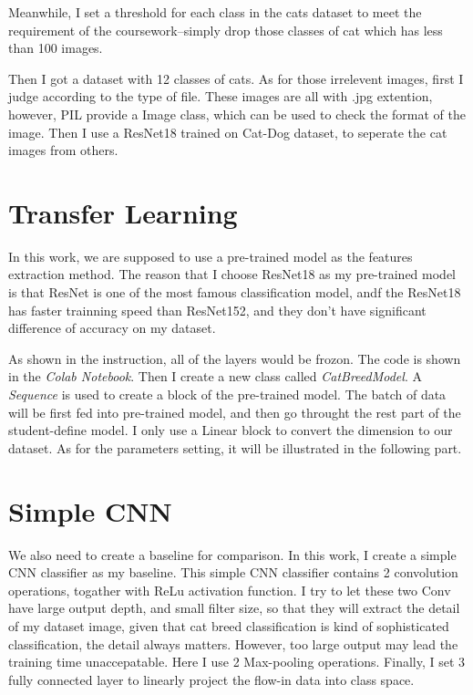 \documentclass[12pt]{article}
\begin{document}
Meanwhile, I set a threshold for each class in the cats dataset to
meet the requirement of the coursework--simply drop those classes
of cat which has less than 100 images.

Then I got a dataset with 12 classes of cats. 
As for those irrelevent images, first I judge according to the type of file.
These images are all with .jpg extention, however, PIL provide a Image class,
which can be used to check the format of the image.
Then I use a ResNet18 trained on Cat-Dog dataset, to seperate the cat images from others.

\section{Transfer Learning}
In this work, we are supposed to use a pre-trained model 
as the features extraction method. The reason that I choose 
ResNet18 as my pre-trained model is that ResNet is one of the most famous classification model\cite{targ2016resnet}\cite{akiba2017extremely},
andf the ResNet18 has faster trainning speed than ResNet152,
and they don't have significant difference of accuracy on my dataset.

As shown in the instruction, all of the layers would be frozon. 
The code is shown in the \textit{Colab Notebook}. 
Then I create a new class called \textit{CatBreedModel}. 
A \textit{Sequence} is used to create a block of the pre-trained model.
The batch of data will be first fed into pre-trained model, 
and then go throught the rest part of the student-define model.
I only use a Linear block to convert the dimension to our dataset. 
As for the parameters setting, it will be illustrated in the following part.


\section{Simple CNN}
We also need to create a baseline for comparison.
In this work, I create a simple CNN classifier as my baseline.
This simple CNN classifier contains 2 convolution operations, 
togather with ReLu activation function. I try to let these two Conv have
large output depth, and small filter size, so that they will extract the 
detail of my dataset image, given that cat breed classification is kind of 
sophisticated classification, the detail always matters.
However, too large output may lead the training time unaccepatable. 
Here I use 2 Max-pooling operations. Finally, I set 3 fully connected layer to 
linearly project the flow-in data into class space.
\end{document}
